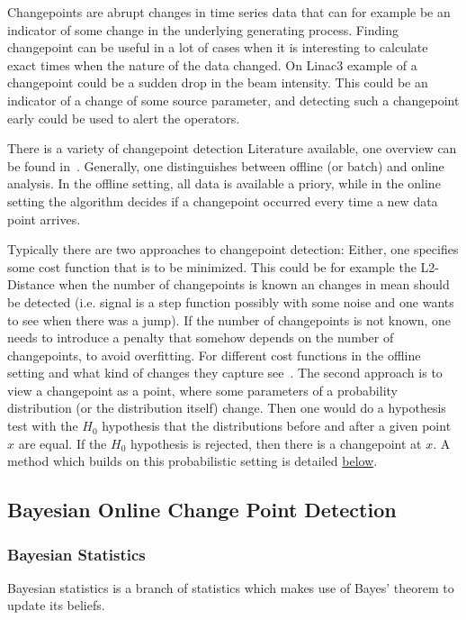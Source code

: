 \documentclass[12pt,a4paper]{article}
\begin{document}
Changepoints are abrupt changes in time series data that can for example be an indicator of some change in the underlying generating process. Finding changepoint can be useful in a lot of cases when it is interesting to calculate exact times when the nature of the data changed. On Linac3 example of a changepoint could be a sudden drop in the beam intensity. This could be an indicator of a change of some source parameter, and detecting such a changepoint early could be used to alert the operators.

There is a variety of changepoint detection Literature available, one overview can be found in~\cite{Aminikhanghahi:surveymethodstime}. Generally, one distinguishes between offline (or batch) and online analysis. In the offline setting, all data is available a priory, while in the online setting the algorithm decides if a changepoint occurred every time a new data point arrives. 

Typically there are two approaches to changepoint detection: Either, one specifies some cost function that is to be minimized. This could be for example the L2-Distance when the number of changepoints is known an changes in mean should be detected (i.e. signal is a step function possibly with some noise and one wants to see when there was a jump). If the number of changepoints is not known, one needs to introduce a penalty that somehow depends on the number of changepoints, to avoid overfitting. For different cost functions in the offline setting and what kind of changes they capture see~\cite{Truong:Selectivereviewoffline}. The second approach is to view a changepoint as a point, where some parameters of a probability distribution (or the distribution itself) change. Then one would do a hypothesis test with the $H_0$ hypothesis that the distributions before and after a given point $x$ are equal. If the $H_0$ hypothesis is rejected, then there is a changepoint at $x$. A method which builds on this probabilistic setting is detailed \protect\hyperlink{bayesian-online-changepoint-detection}{below}.

\hypertarget{bayesian-online-changepoint-detection}{
\subsection{Bayesian Online Change Point Detection}\label{bayesian-online-changepoint-detection}}

\subsubsection{Bayesian Statistics}
Bayesian statistics is a branch of statistics which makes use of Bayes' theorem to update its beliefs.
\end{document}
